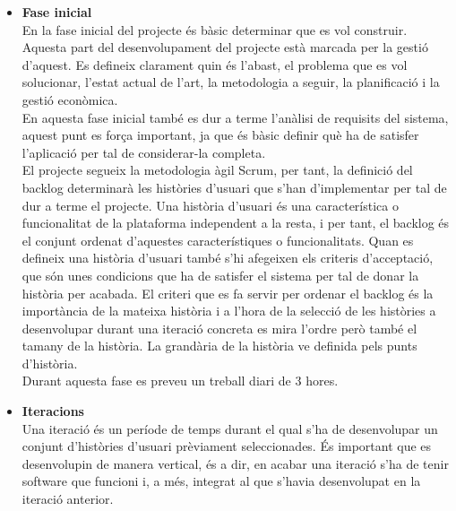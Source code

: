 \begin{itemize}
\item{}\textbf{Fase inicial}\\
En la fase inicial del projecte és bàsic determinar que es vol construir.
Aquesta part del desenvolupament del projecte està marcada per la gestió d'aquest. Es defineix clarament quin és l'abast, el problema que es
vol solucionar, l'estat actual de l'art, la metodologia a seguir, la planificació i la gestió econòmica.\\

En aquesta fase inicial també es dur a terme l'anàlisi de requisits del sistema, aquest punt es força important, ja que és bàsic definir què ha de
satisfer l'aplicació per tal de considerar-la completa.\\

El projecte segueix la metodologia àgil Scrum, per tant, la definició del
backlog determinarà les històries d'usuari que s'han d'implementar per
tal de dur a terme el projecte. Una història d'usuari és una característica o funcionalitat de la plataforma independent a la resta, i per tant, el backlog és el conjunt ordenat d'aquestes característiques o funcionalitats. Quan es defineix una història d'usuari també s'hi afegeixen els criteris d'acceptació, que són unes condicions que ha de satisfer el sistema per tal de donar la història per acabada. El criteri que es fa servir per ordenar el backlog és la importància de la mateixa història i a l'hora de la selecció de les històries a desenvolupar durant una iteració concreta es mira l'ordre però també el tamany de la història. La grandària de la història ve definida pels punts d'història.\\

Durant aquesta fase es preveu un treball diari de 3 hores.

\item{}\textbf{Iteracions}\\
Una iteració és un període de temps durant el qual s'ha de desenvolupar
un conjunt d'històries d'usuari prèviament seleccionades. És important
que es desenvolupin de manera vertical, és a dir, en acabar una iteració
s'ha de tenir software que funcioni i, a més, integrat al que s'havia desenvolupat en la iteració anterior.\\


\end{itemize}
